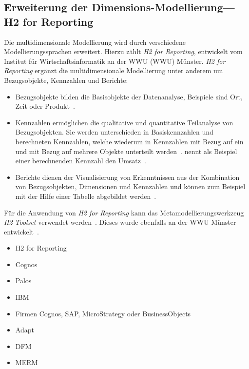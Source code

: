 \documentclass[
  language=german, %
  type=bachelor%
]{isthesis}
\begin{document}
\begin{content}
  \section{Erweiterung der Dimensions-Modellierung---H2 for Reporting}
  Die multidimensionale Modellierung wird durch verschiedene Modellierungssprachen
  erweitert. Hierzu zählt \zB{} \textit{H2 for Reporting}, entwickelt vom
  Institut für Wirtschaftsinformatik an der \acrlong{WWU} (WWU)
  Münster. \textit{H2 for Reporting}
  ergänzt die multidimensionale Modellierung unter anderem um Bezugsobjekte,
  Kennzahlen und Berichte:
  \begin{itemize}
    \item Bezugsobjekte bilden die
      Basisobjekte der Datenanalyse, Beispiele sind Ort, Zeit oder
      Produkt~\cite[][S.  5]{becker2007h2}. 
    \item Kennzahlen ermöglichen die qualitative
      und quantitative Teilanalyse von Bezugsobjekten. Sie werden unterschieden in
      Basiskennzahlen und berechneten  Kennzahlen, welche wiederum in Kennzahlen mit
      Bezug auf ein und mit Bezug auf mehrere Objekte unterteilt werden~\cite[][S.
      15]{becker2007h2}. \textsc{\citeauthor{becker2007h2}} nennt als Beispiel
      einer berechnenden Kennzahl den Umsatz~\cite[][S. 17]{becker2007h2}.
    \item Berichte dienen der Visualisierung von Erkenntnissen aus der Kombination von
      Bezugsobjekten, Dimensionen und Kennzahlen und können zum Beispiel mit der
      Hilfe einer Tabelle abgebildet werden~\cite[][S. 23]{becker2007h2}.
  \end{itemize}

  Für die Anwendung von \textit{H2 for Reporting} kann das
  Metamodellierungswerkzeug \textit{H2-Toolset} verwendet werden~\cite[][S.
  33]{fleischer2013konstruktion}. Dieses wurde ebenfalls an der
  \acrshort{WWU}-Münster entwickelt~\cite[][S. 34]{becker2007h2}.

  \begin{itemize}
    \item H2 for Reporting
    \item Cognos
    \item Palos
    \item IBM
    \item Firmen Cognos, SAP, MicroStrategy oder BusinessObjects
    \item Adapt
    \item DFM
    \item MERM
  \end{itemize}


\end{content}
\end{document}
